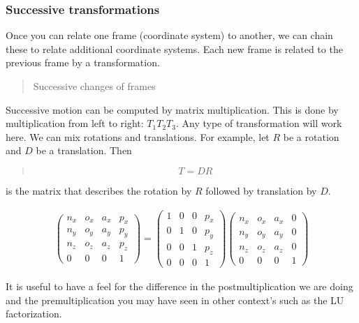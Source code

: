 \hypertarget{successive-transformations}{%
\subsubsection{Successive
transformations}\label{successive-transformations}}

Once you can relate one frame (coordinate system) to another, we can
chain these to relate additional coordinate systems. Each new frame is
related to the previous frame by a transformation.

\begin{quote}
Successive changes of frames
\end{quote}

Successive motion can be computed by matrix multiplication. This is done
by multiplication from left to right: \(T_1 T_2 T_3\). Any type of
transformation will work here. We can mix rotations and translations.
For example, let \(R\) be a rotation and \(D\) be a translation. Then

\begin{quote}
\[T = DR\]
\end{quote}

is the matrix that describes the rotation by \(R\) followed by
translation by \(D\).

\[\begin{aligned}
\begin{pmatrix}
n_x & o_x & a_x & p_x \\
n_y & o_y & a_y & p_y\\
n_z & o_z & a_z & p_z \\
0& 0& 0& 1 \end{pmatrix}
=
\begin{pmatrix}1 & 0 & 0 & p_x \\
0 & 1 & 0 & p_y\\
0 &0 & 1 & p_z \\
0& 0& 0& 1 \end{pmatrix}
\begin{pmatrix}
n_x & o_x & a_x & 0 \\
n_y & o_y & a_y & 0 \\
n_z & o_z & a_z & 0 \\
0& 0& 0& 1 \end{pmatrix}
\end{aligned}\]

It is useful to have a feel for the difference in the postmultiplication
we are doing and the premultiplication you may have seen in other
context's such as the LU factorization.

